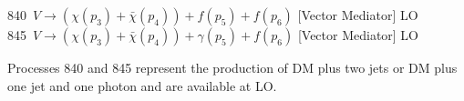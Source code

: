840~$V\to({\chi}(p_3)+\bar{\chi}(p_4)) +f(p_5)+f(p_6)$ [Vector Mediator]  LO\\
845~$V\to({\chi}(p_3)+\bar{\chi}(p_4)) +\gamma(p_5)+f(p_6)$ [Vector Mediator]   LO

Processes 840 and 845 represent the production of DM plus two jets or DM plus one jet and one photon and are available
at LO.
